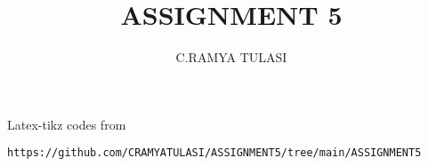 \documentclass[journal,12pt,twocolumn]{IEEEtran}
\DeclareMathOperator*{\Res}{Res}
\begin{document}
\newtheorem{theorem}{Theorem}[section]
\newtheorem{problem}{Problem}
\newtheorem{proposition}{Proposition}[section]
\newtheorem{lemma}{Lemma}[section]
\newtheorem{corollary}[theorem]{Corollary}
\newtheorem{example}{Example}[section]
\newtheorem{definition}[problem]{Definition}

\newcommand{\BEQA}{\begin{eqnarray}}
\newcommand{\EEQA}{\end{eqnarray}}
\newcommand{\define}{\stackrel{\triangle}{=}}

\providecommand{\mbf}{\mathbf}
\providecommand{\pr}[1]{\ensuremath{\Pr\left(#1\right)}}
\providecommand{\qfunc}[1]{\ensuremath{Q\left(#1\right)}}
\providecommand{\sbrak}[1]{\ensuremath{{}\left[#1\right]}}
\providecommand{\lsbrak}[1]{\ensuremath{{}\left[#1\right.}}
\providecommand{\rsbrak}[1]{\ensuremath{{}\left.#1\right]}}
\providecommand{\brak}[1]{\ensuremath{\left(#1\right)}}
\providecommand{\lbrak}[1]{\ensuremath{\left(#1\right.}}
\providecommand{\rbrak}[1]{\ensuremath{\left.#1\right)}}
\providecommand{\cbrak}[1]{\ensuremath{\left\{#1\right\}}}
\providecommand{\lcbrak}[1]{\ensuremath{\left\{#1\right.}}
\providecommand{\rcbrak}[1]{\ensuremath{\left.#1\right\}}}
\theoremstyle{remark}
\newtheorem{rem}{Remark}
\newcommand{\sgn}{\mathop{\mathrm{sgn}}}
\providecommand{\abs}[1]{\left\vert#1\right\vert}
\providecommand{\res}[1]{\Res\displaylimits_{#1}} 
\providecommand{\norm}[1]{\left\lVert#1\right\rVert}
\providecommand{\mtx}[1]{\mathbf{#1}}
\providecommand{\mean}[1]{E\left[ #1 \right]}
\providecommand{\fourier}{\overset{\mathcal{F}}{ \rightleftharpoons}}
\providecommand{\system}{\overset{\mathcal{H}}{ \longleftrightarrow}}
\newcommand{\solution}{\noindent \textbf{Solution: }}
\newcommand{\cosec}{\,\text{cosec}\,}
\providecommand{\dec}[2]{\ensuremath{\overset{#1}{\underset{#2}{\gtrless}}}}
\newcommand{\myvec}[1]{\ensuremath{\begin{pmatrix}#1\end{pmatrix}}}
\newcommand{\mydet}[1]{\ensuremath{\begin{vmatrix}#1\end{vmatrix}}}
\makeatletter
{}
\makeatother
\let\StandardTheFigure\thefigure
\let\vec\mathbf
\renewcommand{\thefigure}{\theproblem}
\def\putbox#1#2#3{\makebox[0in][l]{\makebox[#1][l]{}\raisebox{\baselineskip}[0in][0in]{\raisebox{#2}[0in][0in]{#3}}}}
     \def\rightbox#1{\makebox[0in][r]{#1}}
     \def\centbox#1{\makebox[0in]{#1}}
     \def\topbox#1{\raisebox{-\baselineskip}[0in][0in]{#1}}
     \def\midbox#1{\raisebox{-0.5\baselineskip}[0in][0in]{#1}}
\vspace{3cm}
\title{ASSIGNMENT 5}
\author{C.RAMYA TULASI}
\maketitle
\newpage
\bigskip
\renewcommand{\thefigure}{\theenumi}
\renewcommand{\thetable}{\theenumi}
%
Latex-tikz codes from 
%
\begin{lstlisting}
https://github.com/CRAMYATULASI/ASSIGNMENT5/tree/main/ASSIGNMENT5
\end{lstlisting}
%
\end{document}
